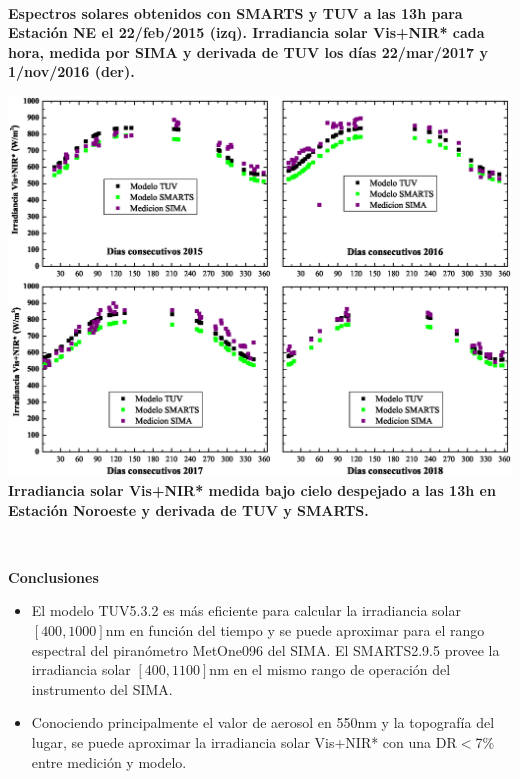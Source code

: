 \documentclass{article}
\begin{document}
\begin{minipage}{0.53\linewidth}
\begin{minipage}{0.4\linewidth}
\end{minipage}\\
\textbf{\textcolor{ver}{
Espectros solares obtenidos con SMARTS y TUV a las 13h para Estación NE el 22/feb/2015 (izq). Irradiancia solar Vis+NIR* cada hora, medida por SIMA y derivada de TUV los días 22/mar/2017 y 1/nov/2016 (der).}}
\end{minipage}
\hspace{1.2cm}
\begin{minipage}{0.45\linewidth}
\includegraphics[scale=0.43]{images/Graph4years.eps}\\
\changefontsizes{10pt} \textbf{\textcolor{ver}{
Irradiancia solar Vis+NIR* medida bajo cielo
despejado  a las 13h en Estación Noroeste y derivada de TUV y SMARTS.}}
\end{minipage}\\
\begin{minipage}{0.60\linewidth}
\begin{center}
\begin{shaded}
\textbf{\textcolor{ver}{Conclusiones}}
\end{shaded}
\end{center}
\begin{itemize}
    \item El modelo TUV5.3.2 es más eficiente para calcular la irradiancia solar $\left[400,1000\right]$nm en función del tiempo y se puede aproximar para el rango espectral del piranómetro MetOne096 del SIMA. El SMARTS2.9.5 provee la irradiancia solar $\left[400,1100\right]$nm en el mismo rango de operación del instrumento del SIMA.
    \item Conociendo principalmente el valor de aerosol en 550nm y la topografía del lugar, se puede aproximar la irradiancia solar Vis+NIR* con una DR$<$7\% entre medición y modelo. 
\end{itemize}
\end{minipage}
\end{document}
